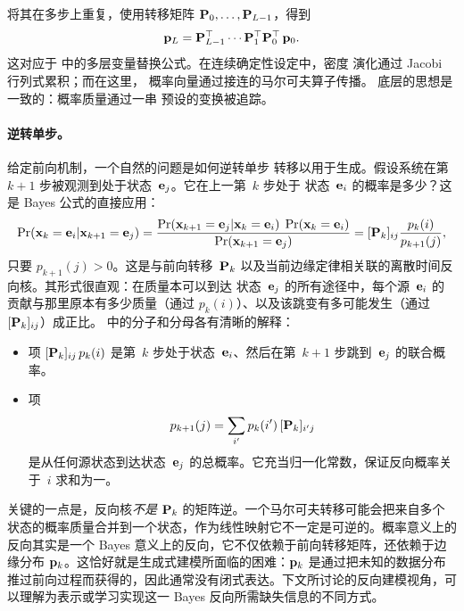 将其在多步上重复，使用转移矩阵
${\mathbf{P}}_0, \dots, {\mathbf{P}}_{L-1}$，得到
\begin{equation*}
{\mathbf{p}}_L = {\mathbf{P}}_{L-1}^\top \cdots {\mathbf{P}}_1^\top {\mathbf{P}}_0^\top\, {\mathbf{p}}_0.
\end{equation*}
这对应于
 中的多层变量替换公式。在连续确定性设定中，密度
演化通过 Jacobi 行列式累积；而在这里，
概率向量通过接连的马尔可夫算子传播。
底层的思想是一致的：概率质量通过一串
预设的变换被追踪。

\paragraph{逆转单步。}
给定前向机制，一个自然的问题是如何逆转单步
转移以用于生成。假设系统在第~$k{+}1$ 步被观测到处于状态~${\mathbf{e}}_j$。它在上一第~$k$ 步处于
状态~${\mathbf{e}}_i$ 的概率是多少？这是 Bayes 公式的直接应用：
\begin{align}
\Pr({\mathbf{x}}_k = {\mathbf{e}}_i | {\mathbf{x}}_{k+1} = {\mathbf{e}}_j)
= \frac{\Pr({\mathbf{x}}_{k+1} = {\mathbf{e}}_j | {\mathbf{x}}_k = {\mathbf{e}}_i)\;\Pr({\mathbf{x}}_k = {\mathbf{e}}_i)}
        {\Pr({\mathbf{x}}_{k+1} = {\mathbf{e}}_j)}  
= [{\mathbf{P}}_k]_{ij}\frac{p_k(i)}{p_{k+1}(j)},
\label{eq:discrete-reverse-kernel}
\end{align}
只要 $p_{k+1}(j)>0$。这是与前向转移~${\mathbf{P}}_k$ 以及当前边缘定律相关联的离散时间反向核。其形式很直观：在质量本可以到达
状态~${\mathbf{e}}_j$ 的所有途径中，每个源~${\mathbf{e}}_i$ 的贡献与那里原本有多少质量（通过 $p_k(i)$）、以及该跳变有多可能发生（通过 $[{\mathbf{P}}_k]_{ij}$）成正比。 中的分子和分母各有清晰的解释：
\begin{itemize}[leftmargin=2em]
    \item {}
    项 $[{\mathbf{P}}_k]_{ij}\,p_k(i)$ 是第~$k$ 步处于状态~${\mathbf{e}}_i$、然后在第~$k{+}1$ 步跳到~${\mathbf{e}}_j$ 的联合概率。

    \item {}
    项
    \[
    p_{k+1}(j) = \sum_{i'} p_k(i')\,[{\mathbf{P}}_k]_{i'j}
    \]
    是从任何源状态到达状态~${\mathbf{e}}_j$ 的总概率。它充当归一化常数，保证反向概率关于~$i$ 求和为一。
\end{itemize}

关键的一点是，反向核\emph{不是} ${\mathbf{P}}_k$ 的矩阵逆。一个马尔可夫转移可能会把来自多个状态的概率质量合并到一个状态，作为线性映射它不一定是可逆的。概率意义上的反向其实是一个 Bayes 意义上的反向，它不仅依赖于前向转移矩阵，还依赖于边缘分布 ${\mathbf{p}}_k$。这恰好就是生成式建模所面临的困难：${\mathbf{p}}_k$ 是通过把未知的数据分布推过前向过程而获得的，因此通常没有闭式表达。下文所讨论的反向建模视角，可以理解为表示或学习实现这一 Bayes 反向所需缺失信息的不同方式。

